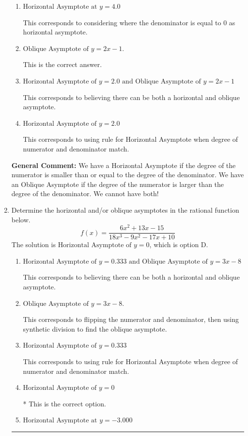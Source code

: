 \documentclass{extbook}[14pt]
\newcommand{\litem}[1]{\item #1

\rule{\textwidth}{0.4pt}}
\begin{document}
\begin{enumerate}
{\begin{enumerate}[label=\Alph*.]
This corresponds to believing there can be both a horizontal and oblique asymptote AND mixing up horizontal/vertical asymoptote.
\item \( \text{Horizontal Asymptote at } y = 4.0 \)

This corresponds to considering where the denominator is equal to 0 as horizontal asymptote.
\item \( \text{Oblique Asymptote of } y = 2x -1. \)

This is the correct answer.
\item \( \text{Horizontal Asymptote of } y = 2.0 \text{ and Oblique Asymptote of } y = 2x -1 \)

This corresponds to believing there can be both a horizontal and oblique asymptote.
\item \( \text{Horizontal Asymptote of } y = 2.0  \)

This corresponds to using rule for Horizontal Asymptote when degree of numerator and denominator match.
\end{enumerate}

\textbf{General Comment:} We have a Horizontal Asymptote if the degree of the numerator is smaller than or equal to the degree of the denominator. We have an Oblique Asymptote if the degree of the numerator is larger than the degree of the denominator. We cannot have both!
}
\litem{
Determine the horizontal and/or oblique asymptotes in the rational function below.
\[ f(x) = \frac{6x^{2} +13 x -15}{18x^{3} -9 x^{2} -17 x + 10} \]The solution is \( \text{Horizontal Asymptote of } y = 0 \), which is option D.\begin{enumerate}[label=\Alph*.]
\item \( \text{Horizontal Asymptote of } y = 0.333 \text{ and Oblique Asymptote of } y = 3x -8 \)

This corresponds to believing there can be both a horizontal and oblique asymptote.
\item \( \text{Oblique Asymptote of } y = 3x -8. \)

This corresponds to flipping the numerator and denominator, then using synthetic division to find the oblique asymptote.
\item \( \text{Horizontal Asymptote of } y = 0.333  \)

This corresponds to using rule for Horizontal Asymptote when degree of numerator and denominator match.
\item \( \text{Horizontal Asymptote of } y = 0 \)

* This is the correct option.
\item \( \text{Horizontal Asymptote at } y = -3.000 \)


\end{enumerate}}
\end{enumerate}
\end{document}
